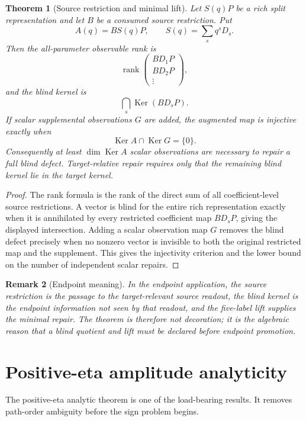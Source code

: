 \documentclass[11pt]{article}
\newtheorem{theorem}{Theorem}[section]
\newtheorem{remark}[theorem]{Remark}
\newcommand{\Ker}{\operatorname{Ker}}
\newcommand{\rank}{\operatorname{rank}}
\begin{document}
\begin{theorem}[Source restriction and minimal lift]
Let \(S(q)P\) be a rich split representation and let \(B\) be a consumed source restriction.  Put
\[
A(q)=B S(q)P,
\qquad
S(q)=\sum_s q^sD_s.
\]
Then the all-parameter observable rank is
\[
\rank\begin{pmatrix}BD_1P\\BD_2P\\ \vdots\end{pmatrix},
\]
and the blind kernel is
\[
\bigcap_s\Ker(BD_sP).
\]
If scalar supplemental observations \(G\) are added, the augmented map is injective exactly when
\[
\Ker A\cap\Ker G=\{0\}.
\]
Consequently at least \(\dim\Ker A\) scalar observations are necessary to repair a full blind defect.  Target-relative repair requires only that the remaining blind kernel lie in the target kernel.
\end{theorem}

\begin{proof}
The rank formula is the rank of the direct sum of all coefficient-level source restrictions.  A vector is blind for the entire rich representation exactly when it is annihilated by every restricted coefficient map \(BD_sP\), giving the displayed intersection.  Adding a scalar observation map \(G\) removes the blind defect precisely when no nonzero vector is invisible to both the original restricted map and the supplement.  This gives the injectivity criterion and the lower bound on the number of independent scalar repairs.
\end{proof}

\begin{remark}[Endpoint meaning]
In the endpoint application, the source restriction is the passage to the target-relevant source readout, the blind kernel is the endpoint information not seen by that readout, and the five-label lift supplies the minimal repair.  The theorem is therefore not decoration; it is the algebraic reason that a blind quotient and lift must be declared before endpoint promotion.
\end{remark}

\section{Positive-eta amplitude analyticity}

The positive-eta analytic theorem is one of the load-bearing results.  It removes path-order ambiguity before the sign problem begins.
\end{document}
